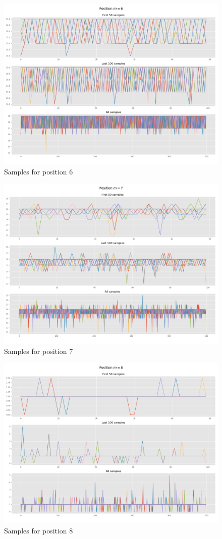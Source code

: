 \documentclass[]{article}
\begin{document}
\begin{figure}[H]
	\begin{center}
		
		\includegraphics[width=.5\textwidth]{task4/figures/T_2_4/Q2/convergence_pos6.png}
		\caption*{Samples for position 6}
	\end{center}
\end{figure}

\begin{figure}[H]
	\begin{center}
		
		\includegraphics[width=.5\textwidth]{task4/figures/T_2_4/Q2/convergence_pos7.png}
		\caption*{Samples for position 7}
	\end{center}
\end{figure}

\begin{figure}[H]
	\begin{center}
		
		\includegraphics[width=.5\textwidth]{task4/figures/T_2_4/Q2/convergence_pos8.png}
		\caption*{Samples for position 8}
	\end{center}
\end{figure}
\end{document}
